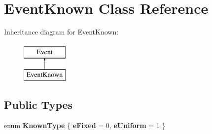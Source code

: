 \hypertarget{class_event_known}{\section{Event\-Known Class Reference}
\label{class_event_known}
}
Inheritance diagram for Event\-Known\-:\begin{figure}[H]
\begin{center}
\leavevmode
\includegraphics[height=2.000000cm]{class_event_known}
\end{center}
\end{figure}
\subsection*{Public Types}
\begin{DoxyCompactItemize}
\item 
enum {\bfseries Known\-Type} \{ {\bfseries e\-Fixed} = 0, 
{\bfseries e\-Uniform} = 1
 \}
\end{DoxyCompactItemize}

